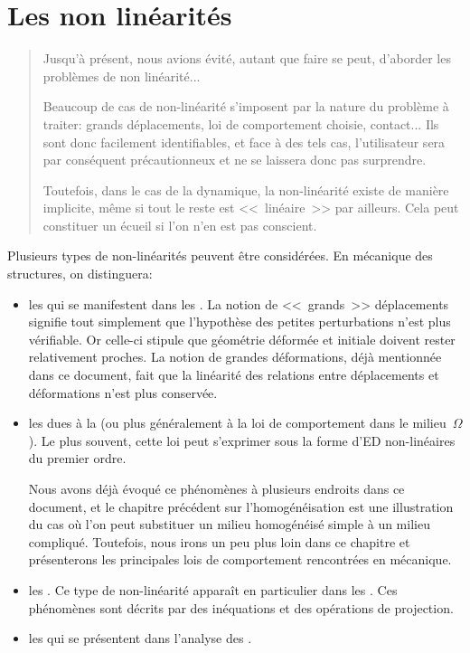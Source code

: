 \chapter{Les non linéarités}\label{Ch-NL}
\begin{abstract}
Jusqu'à présent, nous avions évité, autant que faire se peut, d'aborder les problèmes
de non linéarité...

\medskip
Beaucoup de cas de non-linéarité s'imposent par la nature du problème à traiter:
grands déplacements, loi de comportement choisie, contact...
Ils sont donc facilement identifiables, et face à des tels cas, l'utilisateur sera par conséquent
précautionneux et ne se laissera donc pas surprendre.

Toutefois, dans le cas de la dynamique, la non-linéarité existe de manière implicite, même si
tout le reste est <<~linéaire~>> par ailleurs. Cela peut constituer un écueil si l'on n'en est pas
conscient.
\end{abstract}

Plusieurs types de non-linéarités peuvent être considérées. En mécanique des structures, on distinguera:
\begin{itemize}
   \item les  qui se manifestent dans les
	.
	La notion de <<~grands~>> déplacements signifie tout simplement que l'hypothèse des petites perturbations
	n'est plus vérifiable. Or celle-ci stipule que géométrie déformée et initiale doivent rester relativement
	proches.
	La notion de grandes déformations, déjà mentionnée dans ce document, fait que la linéarité des
	relations entre déplacements et déformations n'est plus conservée.

\item les  dues à la  (ou plus généralement à la loi de comportement dans le milieu~$\Omega$).
	Le plus souvent, cette loi peut s'exprimer sous la forme d'ED non-linéaires du premier ordre.

	Nous avons déjà évoqué ce phénomènes à plusieurs endroits dans ce document,
	et le chapitre précédent sur l'homogénéisation est une illustration du cas où l'on peut
	substituer un milieu homogénéisé simple à un milieu compliqué. Toutefois, nous irons
	un peu plus loin dans ce chapitre et présenterons les principales lois de comportement
	rencontrées en mécanique.

  \item les .
	Ce type de non-linéarité apparaît en particulier dans les .
	Ces phénomènes sont décrits par des inéquations et des opérations de projection.

  \item les  qui se présentent dans
	l'analyse des .
\end{itemize}




